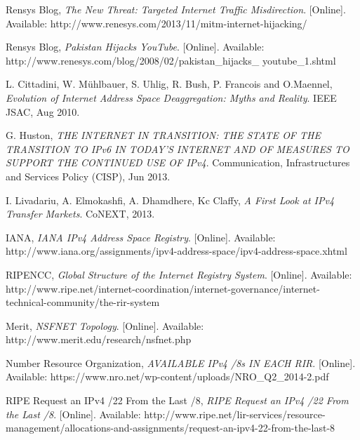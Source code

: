 \documentclass[11pt,a4paper]{scrreprt}
\begin{document}

\renewcommand\bibname{\chapter{References}}
\begin{thebibliography}{count}



    Rensys Blog,
    \emph{The New Threat: Targeted Internet Traffic Misdirection}.
    [Online]. Available: http://www.renesys.com/2013/11/mitm-internet-hijacking/


    Rensys Blog,
    \emph{Pakistan Hijacks YouTube}.
    [Online]. Available: http://www.renesys.com/blog/2008/02/pakistan\_hijacks\_
youtube\_1.shtml

	L. Cittadini, W. M\"{u}hlbauer, S. Uhlig, R. Bush, P. Francois and O.Maennel,
	\emph{Evolution of Internet Address Space Deaggregation: Myths and Reality}.
	IEEE JSAC, Aug 2010.

	G. Huston,
	\emph{THE INTERNET IN TRANSITION: THE STATE OF THE TRANSITION TO IPv6 IN TODAY'S
INTERNET AND OF MEASURES TO SUPPORT THE CONTINUED USE OF IPv4}.
	Communication, Infrastructures and Services Policy (CISP), Jun 2013.
	

	I. Livadariu, A. Elmokashfi, A. Dhamdhere, Kc Claffy,
	\emph{A First Look at IPv4 Transfer Markets}.
	CoNEXT, 2013.
	
	IANA,
	\emph{IANA IPv4 Address Space Registry}.
	[Online]. Available: http://www.iana.org/assignments/ipv4-address-space/ipv4-address-space.xhtml
	

	RIPENCC,
	\emph{Global Structure of the Internet Registry System}.
	[Online]. Available: http://www.ripe.net/internet-coordination/internet-governance/internet-technical-community/the-rir-system
	
	Merit,
	\emph{NSFNET Topology}.
	[Online]. Available: http://www.merit.edu/research/nsfnet.php	
	
	Number Resource Organization,
	\emph{AVAILABLE IPv4 /8s IN EACH RIR}.
	[Online]. Available: https://www.nro.net/wp-content/uploads/NRO\_Q2\_2014-2.pdf
	
	RIPE Request an IPv4 /22 From the Last /8,
	\emph{RIPE Request an IPv4 /22 From the Last /8}.
	[Online]. Available: http://www.ripe.net/lir-services/resource-management/allocations-and-assignments/request-an-ipv4-22-from-the-last-8


\end{thebibliography}
\end{document}
